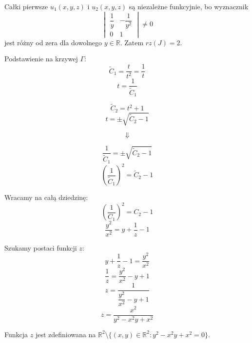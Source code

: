 \documentclass{article}
\begin{document}
Całki pierwsze $u_1(x,y,z)$ i $u_2(x,y,z)$ są niezależne funkcyjnie, bo wyznacznik
$$
\begin{vmatrix}
\dfrac{1}{y} & -\dfrac{1}{y^2} \\
0 & 1
\end{vmatrix} \ne 0
$$
jest różny od zera dla dowolnego $y \in \mathbb{R}$. Zatem $rz(J) = 2$. 

\bigskip

Podstawienie na krzywej $\Gamma$:
$$
\tilde{C}_1 = \frac{t}{t^2} = \frac{1}{t}
$$
$$
t = \frac{1}{\tilde{C}_1}
$$

$$
\tilde{C}_2 = t^2 + 1
$$
$$
t = \pm \sqrt{\tilde{C}_2 - 1}
$$

$$
\Downarrow
$$

$$
\frac{1}{\tilde{C}_1} = \pm \sqrt{\tilde{C}_2 - 1}
$$
$$
\left(\frac{1}{\tilde{C}_1}\right)^2 = \tilde{C}_2 - 1
$$


Wracamy na całą dziedzinę:
$$
\left(\frac{1}{{C}_1}\right)^2 = {C}_2 - 1
$$
$$
\frac{y^2}{x^2} = y + \frac{1}{z} - 1 
$$


Szukamy postaci funkcji $z$:
$$
y + \frac{1}{z} - 1 = \frac{y^2}{x^2}
$$
$$
\frac{1}{z} = \frac{y^2}{x^2} -y + 1
$$
$$
z = \frac{1}{\dfrac{y^2}{x^2} -y + 1}
$$
$$
z = \frac{x^2}{y^2 - x^2y + x^2}
$$


Funkcja $z$ jest zdefiniowana na $\mathbb{R}^2 \setminus \{(x,y) \in \mathbb{R}^2 : y^2 - x^2y + x^2 = 0\}$.
\end{document}

